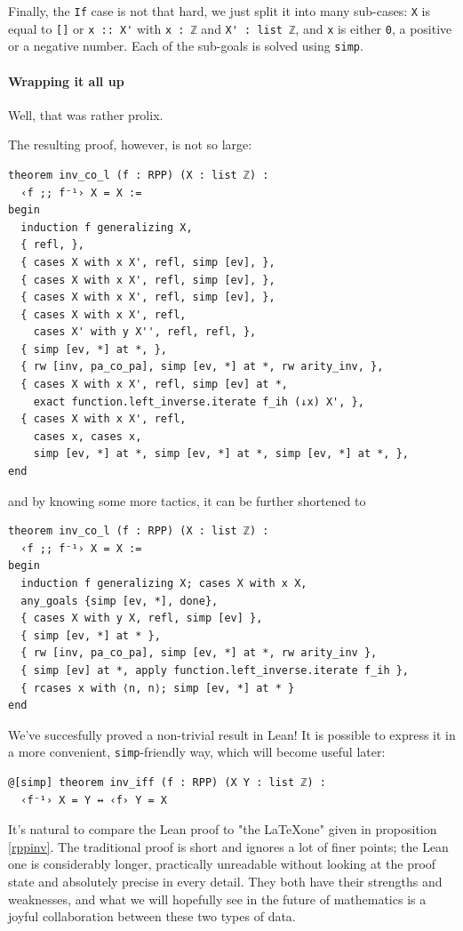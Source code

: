\documentclass{book}
\theoremstyle{definition}
\theoremstyle{remark}
\theoremstyle{plain}
\begin{document}
Finally, the \lstinline{If} case is not that hard,
we just split it into many sub-cases:
\lstinline{X} is equal to \lstinline{[]} or \lstinline{x :: X'} with \lstinline{x : ℤ} and \lstinline{X' : list ℤ},
and \lstinline{x} is either \lstinline{0}, a positive or a negative number.
Each of the sub-goals is solved using \lstinline{simp}.

\paragraph{Wrapping it all up}
Well, that was rather prolix.

The resulting proof, however, is not so large:
\begin{lstlisting}
theorem inv_co_l (f : RPP) (X : list ℤ) :
  ‹f ;; f⁻¹› X = X :=
begin
  induction f generalizing X,
  { refl, },
  { cases X with x X', refl, simp [ev], },
  { cases X with x X', refl, simp [ev], },
  { cases X with x X', refl, simp [ev], },
  { cases X with x X', refl,
    cases X' with y X'', refl, refl, },
  { simp [ev, *] at *, },
  { rw [inv, pa_co_pa], simp [ev, *] at *, rw arity_inv, },
  { cases X with x X', refl, simp [ev] at *,
    exact function.left_inverse.iterate f_ih (↓x) X', },
  { cases X with x X', refl,
    cases x, cases x,
    simp [ev, *] at *, simp [ev, *] at *, simp [ev, *] at *, },
end
\end{lstlisting}
and by knowing some more tactics, it can be further shortened to
\begin{lstlisting}
theorem inv_co_l (f : RPP) (X : list ℤ) :
  ‹f ;; f⁻¹› X = X :=
begin
  induction f generalizing X; cases X with x X,
  any_goals {simp [ev, *], done},
  { cases X with y X, refl, simp [ev] },
  { simp [ev, *] at * },
  { rw [inv, pa_co_pa], simp [ev, *] at *, rw arity_inv },
  { simp [ev] at *, apply function.left_inverse.iterate f_ih },
  { rcases x with ⟨n, n⟩; simp [ev, *] at * }
end
\end{lstlisting}
We've succesfully proved a non-trivial result in Lean!
It is possible to express it in a more convenient, \lstinline{simp}-friendly way, which will become useful later:
\begin{lstlisting}
@[simp] theorem inv_iff (f : RPP) (X Y : list ℤ) :
  ‹f⁻¹› X = Y ↔ ‹f› Y = X
\end{lstlisting}

It's natural to compare the Lean proof to "the \LaTeX\space one" given in proposition \ref{rppinv}.
The traditional proof is short and ignores a lot of finer points;
the Lean one is considerably longer,
practically unreadable without looking at the proof state and absolutely precise in every detail.
They both have their strengths and weaknesses,
and what we will hopefully see in the future of mathematics is a joyful collaboration between these two types of data.
\end{document}
